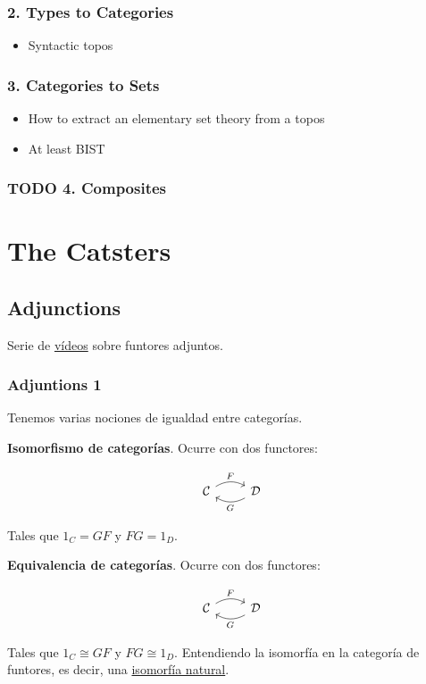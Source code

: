 \documentclass[11pt]{article}
\begin{document}
\subsubsection*{2. Types to Categories}
\label{sec-1-7-2}
\begin{itemize}
\item Syntactic topos
\label{sec-1-7-2-1}
\end{itemize}
\subsubsection*{3. Categories to Sets}
\label{sec-1-7-3}
\begin{itemize}
\item How to extract an elementary set theory from a topos
\label{sec-1-7-3-1}
\item At least BIST
\label{sec-1-7-3-2}
\end{itemize}
\subsubsection*{{\bfseries\sffamily TODO} 4. Composites}
\label{sec-1-7-4}

\section*{The Catsters}
\label{sec-2}
\subsection*{Adjunctions}
\label{sec-2-1}
Serie de \href{https://www.youtube.com/playlist?list=PL54B49729E5102248}{vídeos} sobre funtores adjuntos.

\subsubsection*{Adjuntions 1}
\label{sec-2-1-1}
Tenemos varias nociones de igualdad entre categorías.

\begin{definition}
\textbf{Isomorfismo de categorías}. Ocurre con dos functores:

\[ \begin{tikzcd}
{\cal C} \arrow[bend left]{r}{F} & {\cal D} \arrow[bend left]{l}{G}
\end{tikzcd}
\]

Tales que $1_C = GF$ y $FG = 1_D$.
\end{definition}

\begin{definition}
\textbf{Equivalencia de categorías}. Ocurre con dos functores:

\[ \begin{tikzcd}
{\cal C} \arrow[bend left]{r}{F} & {\cal D} \arrow[bend left]{l}{G}
\end{tikzcd}
\]

Tales que $1_C \cong GF$ y $FG \cong 1_D$. Entendiendo la isomorfía en la 
categoría de funtores, es decir, una \href{https://ncatlab.org/nlab/show/natural+isomorphism}{isomorfía natural}.
\end{definition}
\end{document}
